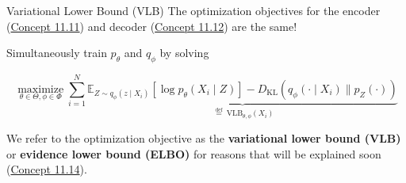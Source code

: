 \begin{frame}[allowframebreaks]

\begin{mydefinitionblock}{11.13}{Variational Lower Bound (VLB)}
    The optimization objectives for the encoder (\hyperref[concept:11.11]{Concept 11.11}) and decoder (\hyperref[concept:11.12]{Concept 11.12}) are the same!

    Simultaneously train $p_{\theta}$ and $q_{\phi}$ by solving

    $$
    \underset{\theta \in \Theta, \phi \in \Phi}{\operatorname{maximize}} \sum_{i=1}^{N} \underbrace{\mathbb{E}_{Z \sim q_{\phi}\left(z \mid X_{i}\right)}\left[\log p_{\theta}\left(X_{i} \mid Z\right)\right]-D_{\mathrm{KL}}\left(q_{\phi}\left(\cdot \mid X_{i}\right) \| p_{Z}(\cdot)\right)}_{\stackrel{\text { def }}{=} \mathrm{VLB}_{\theta, \phi}\left(X_{i}\right)}
    $$

    We refer to the optimization objective as the \textbf{variational lower bound (VLB)} or \textbf{evidence lower bound (ELBO)} for reasons that will be explained soon (\hyperref[concept:11.14]{Concept 11.14}).
\end{mydefinitionblock}

\end{frame}

